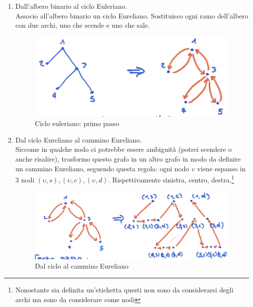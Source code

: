 \begin{enumerate}
    \item Dall'albero binario al ciclo Euleriano.\\
    Associo all'albero binario un ciclo Eureliano. Sostituisco ogni ramo dell'albero con due archi, uno che scende e uno che sale.

    \begin{figure}[h]
        \centering
        \includegraphics[scale=0.35]{images/ciclo_euleriano1.png}
        \caption{Ciclo euleriano: primo passo}
        \label{fig:my_label}
    \end{figure}

    \item Dal ciclo Eureliano al cammino Eureliano.\\
    Siccome in qualche nodo ci potrebbe essere ambiguità (potrei scendere o anche risalire), trasformo questo grafo in un altro grafo in modo da definire un cammino Eureliano, seguendo questa regola: ogni nodo $\upsilon$ viene espanso in $3$ nodi $(\upsilon, s), (\upsilon, c), (\upsilon, d)$. Rispettivamente sinistra, centro, destra.\footnote{Nonostante sia definita un'etichetta questi non sono da considerarsi degli archi ma sono da considerare come nodi}

    \begin{figure}[h]
        \centering
        \includegraphics[scale=0.35]{images/cliclo_eureliano2.png}
        \caption{Dal ciclo al cammino Eureliano}
        \label{fig:my_label}
    \end{figure}


\end{enumerate}
